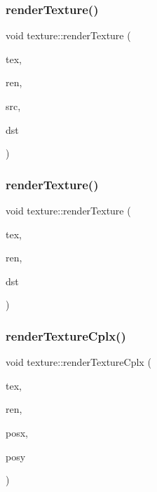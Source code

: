 \mbox{\label{classtexture_a6488137004fa3cae90ae70a3e1ccb5d7}} 
\subsubsection{\texorpdfstring{render\+Texture()}{renderTexture()}\hspace{0.1cm}{\footnotesize\ttfamily [1/2]}}
{\footnotesize\ttfamily void texture\+::render\+Texture (\begin{DoxyParamCaption}\item[{S\+D\+L\+\_\+\+Texture $\ast$}]{tex,  }\item[{S\+D\+L\+\_\+\+Renderer $\ast$}]{ren,  }\item[{S\+D\+L\+\_\+\+Rect}]{src,  }\item[{S\+D\+L\+\_\+\+Rect}]{dst }\end{DoxyParamCaption})}

\mbox{\label{classtexture_a0d68b4cace4e1d4269661f9a7aa89b22}} 
\subsubsection{\texorpdfstring{render\+Texture()}{renderTexture()}\hspace{0.1cm}{\footnotesize\ttfamily [2/2]}}
{\footnotesize\ttfamily void texture\+::render\+Texture (\begin{DoxyParamCaption}\item[{S\+D\+L\+\_\+\+Texture $\ast$}]{tex,  }\item[{S\+D\+L\+\_\+\+Renderer $\ast$}]{ren,  }\item[{S\+D\+L\+\_\+\+Rect}]{dst }\end{DoxyParamCaption})}

\mbox{\label{classtexture_ada440ad92026f4633c1218338331abc3}} 
\subsubsection{\texorpdfstring{render\+Texture\+Cplx()}{renderTextureCplx()}}
{\footnotesize\ttfamily void texture\+::render\+Texture\+Cplx (\begin{DoxyParamCaption}\item[{S\+D\+L\+\_\+\+Texture $\ast$}]{tex,  }\item[{S\+D\+L\+\_\+\+Renderer $\ast$}]{ren,  }\item[{float}]{posx,  }\item[{float}]{posy }\end{DoxyParamCaption})}

